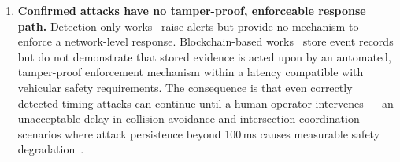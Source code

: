 \begin{enumerate}
 \item \textbf{Confirmed attacks have no tamper-proof,
enforceable response path.}
Detection-only works~\cite{Shoaib2023Detection,Shoaib2021Timing,Arif2019Timing} raise alerts but
provide no mechanism to enforce a network-level response.
Blockchain-based works~\cite{Mozumder2020Blockchain,Derhab2021BMC,alkhamisi2024bcs}
store event records but do not demonstrate that stored
evidence is acted upon by an automated, tamper-proof
enforcement mechanism within a latency compatible with
vehicular safety requirements. The consequence is that
even correctly detected timing attacks can continue
until a human operator intervenes --- an unacceptable
delay in collision avoidance and intersection
coordination scenarios where attack persistence beyond
100\,ms causes measurable safety degradation~\cite{Arif2019Timing}.

\end{enumerate}
